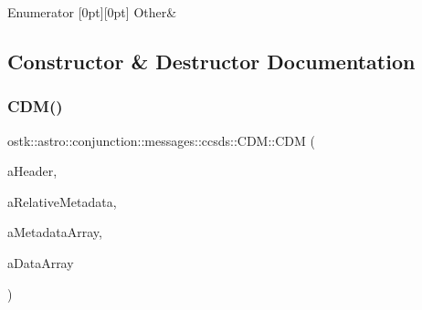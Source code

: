 \begin{DoxyEnumFields}{Enumerator}
[0pt][0pt]{}\mbox{\label{classostk_1_1astro_1_1conjunction_1_1messages_1_1ccsds_1_1_c_d_m_a9ef446f2327904fc0516249120ec9d71a6311ae17c1ee52b36e68aaf4ad066387}} 
Other&\\
\hline

\end{DoxyEnumFields}


\subsection{Constructor \& Destructor Documentation}
\mbox{\label{classostk_1_1astro_1_1conjunction_1_1messages_1_1ccsds_1_1_c_d_m_a7384b77a16261388ac290456f9691da2}} 
\subsubsection{\texorpdfstring{C\+D\+M()}{CDM()}}
{\footnotesize\ttfamily ostk\+::astro\+::conjunction\+::messages\+::ccsds\+::\+C\+D\+M\+::\+C\+DM (\begin{DoxyParamCaption}\item[{const \hyperlink{structostk_1_1astro_1_1conjunction_1_1messages_1_1ccsds_1_1_c_d_m_1_1_header}{C\+D\+M\+::\+Header} \&}]{a\+Header,  }\item[{const \hyperlink{structostk_1_1astro_1_1conjunction_1_1messages_1_1ccsds_1_1_c_d_m_1_1_relative_metadata}{C\+D\+M\+::\+Relative\+Metadata} \&}]{a\+Relative\+Metadata,  }\item[{const Array$<$ \hyperlink{structostk_1_1astro_1_1conjunction_1_1messages_1_1ccsds_1_1_c_d_m_1_1_metadata}{C\+D\+M\+::\+Metadata} $>$ \&}]{a\+Metadata\+Array,  }\item[{const Array$<$ \hyperlink{structostk_1_1astro_1_1conjunction_1_1messages_1_1ccsds_1_1_c_d_m_1_1_data}{C\+D\+M\+::\+Data} $>$}]{a\+Data\+Array }\end{DoxyParamCaption})}



